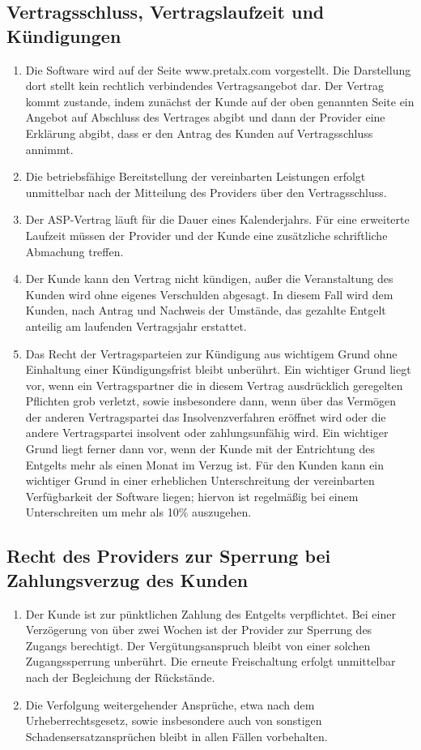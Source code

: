 \documentclass{terms}
\begin{document}
\subsection{Vertragsschluss, Vertragslaufzeit und Kündigungen}
\begin{enumerate}
\item Die Software wird auf der Seite www.pretalx.com vorgestellt.
      Die Darstellung dort stellt kein rechtlich verbindendes Vertragsangebot dar.
      Der Vertrag kommt zustande, indem zunächst der Kunde auf der oben genannten Seite ein Angebot auf Abschluss des Vertrages abgibt und dann der Provider eine Erklärung abgibt, dass er den Antrag des Kunden auf Vertragsschluss annimmt.
\item Die betriebsfähige Bereitstellung der vereinbarten Leistungen erfolgt unmittelbar nach der Mitteilung des Providers über den Vertragsschluss.
\item Der ASP-Vertrag läuft für die Dauer eines Kalenderjahrs.
      Für eine erweiterte Laufzeit müssen der Provider und der Kunde eine zusätzliche schriftliche Abmachung treffen.
\item Der Kunde kann den Vertrag nicht kündigen, außer die Veranstaltung des Kunden wird ohne eigenes Verschulden abgesagt.
      In diesem Fall wird dem Kunden, nach Antrag und Nachweis der Umstände, das gezahlte Entgelt anteilig am laufenden Vertragsjahr erstattet.
\item Das Recht der Vertragsparteien zur Kündigung aus wichtigem Grund ohne Einhaltung einer Kündigungsfrist bleibt unberührt.
      Ein wichtiger Grund liegt vor, wenn ein Vertragspartner die in diesem Vertrag ausdrücklich geregelten Pflichten grob verletzt, sowie insbesondere dann, wenn über das Vermögen der anderen Vertragspartei das Insolvenzverfahren eröffnet wird oder die andere Vertragspartei insolvent oder zahlungsunfähig wird.
      Ein wichtiger Grund liegt ferner dann vor, wenn der Kunde mit der Entrichtung des Entgelts mehr als einen Monat im Verzug ist.
      Für den Kunden kann ein wichtiger Grund in einer erheblichen Unterschreitung der vereinbarten Verfügbarkeit der Software liegen; hiervon ist regelmäßig bei einem Unterschreiten um mehr als 10\% auszugehen.
\end{enumerate}

\subsection{Recht des Providers zur Sperrung bei Zahlungsverzug des Kunden}
\begin{enumerate}
\item Der Kunde ist zur pünktlichen Zahlung des Entgelts verpflichtet.
      Bei einer Verzögerung von über zwei Wochen ist der Provider zur Sperrung des Zugangs berechtigt.
      Der Vergütungsanspruch bleibt von einer solchen Zugangssperrung unberührt.
      Die erneute Freischaltung erfolgt unmittelbar nach der Begleichung der Rückstände.
\item Die Verfolgung weitergehender Ansprüche, etwa nach dem Urheberrechtsgesetz, sowie insbesondere auch von sonstigen Schadensersatzansprüchen bleibt in allen Fällen vorbehalten.
\end{enumerate}
\end{document}
